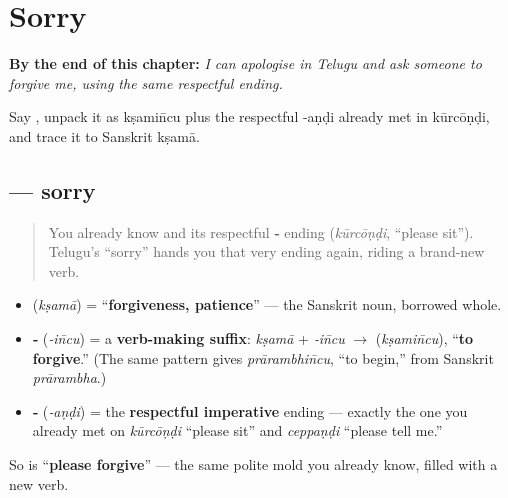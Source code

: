 
\chapter{Sorry}
\label{ch:te-sorry}

\begin{chapteropening}
\textbf{By the end of this chapter:} \emph{I can apologise in Telugu and ask someone to forgive me, using the same respectful ending.}

Say , unpack it as kṣamin̄cu plus the respectful -aṇḍi already met in kūrcōṇḍi, and trace it to Sanskrit kṣamā.
\end{chapteropening}

\section[\texorpdfstring{\te{క్షమించండి} (kṣamin̄caṇḍi)}{క్షమించండి (kṣamin̄caṇḍi)}]{ — sorry}

\label{lesson:TE-C09-kshaminchandi}



\begin{quote}
You already know \textbf{} and its respectful \textbf{‑} ending (\emph{kūrcōṇḍi}, \textquotedblleft{}please sit\textquotedblright{}). Telugu's \textquotedblleft{}sorry\textquotedblright{} hands you that very ending again, riding a brand-new verb.
\end{quote}

\begin{cousinweb}
\begin{itemize}
\raggedright
  \item \textbf{} (\emph{kṣamā}) = \textquotedblleft{}\textbf{forgiveness, patience}\textquotedblright{} — the Sanskrit noun, borrowed whole.
  \item \textbf{‑} (\emph{‑in̄cu}) = a \textbf{verb-making suffix}: \emph{kṣamā} + \emph{‑in̄cu} $\to$ \textbf{} (\emph{kṣamin̄cu}), \textquotedblleft{}\textbf{to forgive}.\textquotedblright{} (The same pattern gives \emph{prārambhin̄cu}, \textquotedblleft{}to begin,\textquotedblright{} from Sanskrit \emph{prārambha}.)
  \item \textbf{‑} (\emph{‑aṇḍi}) = the \textbf{respectful imperative} ending — exactly the one you already met on \emph{kūrcōṇḍi} \textquotedblleft{}please sit\textquotedblright{} and \emph{ceppaṇḍi} \textquotedblleft{}please tell me.\textquotedblright{}
\end{itemize}

So \textbf{} is \textquotedblleft{}\textbf{please forgive}\textquotedblright{} — the same polite mold you already know, filled with a new verb.
\end{cousinweb}

